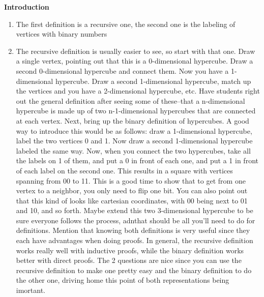 \item \textbf{Introduction}
\begin{enumerate}[label=*]
\item The first definition is a recursive one, the second one is the labeling of vertices with binary numbers
\item The recursive definition is usually easier to see, so start with that one. Draw a single vertex, pointing out that this is a 0-dimensional hypercube. Draw a second 0-dimensional hypercube and connect them. Now you have a 1-dimensional hypercube. Draw a second 1-dimensional hypercube, match up the vertices and you have a 2-dimensional hypercube, etc. Have students right out the general definition after seeing some of these--that a n-dimensional hypercube is made up of two n-1-dimensional hypercubes that are connected at each vertex.
Next, bring up the binary definition of hypercubes. A good way to introduce this would be as follows: draw a 1-dimensional hypercube, label the two vertices 0 and 1. Now draw a second 1-dimensional hypercube labeled the same way. Now, when you connect the two hypercubes, take all the labels on 1 of them, and put a 0 in front of each one, and put a 1 in front of each label on the second one. This results in a square with vertices spanning from 00 to 11. This is a good time to show that to get from one vertex to a neighbor, you only need to flip one bit. You can also point out that this kind of looks like cartesian coordinates, with 00 being next to 01 and 10, and so forth. Maybe extend this two 3-dimensional hypercube to be sure everyone follows the process, adnthat should be all you’ll need to do for definitions.
Mention that knowing both definitions is very useful since they each have advantages when doing proofs. In general, the recursive definition works really well with inductive proofs, while the binary definition works better with direct proofs. The 2 questions are nice since you can use the recursive definition to make one pretty easy and the binary definition to do the other one, driving home this point of both representations being imortant.
\end{enumerate}
